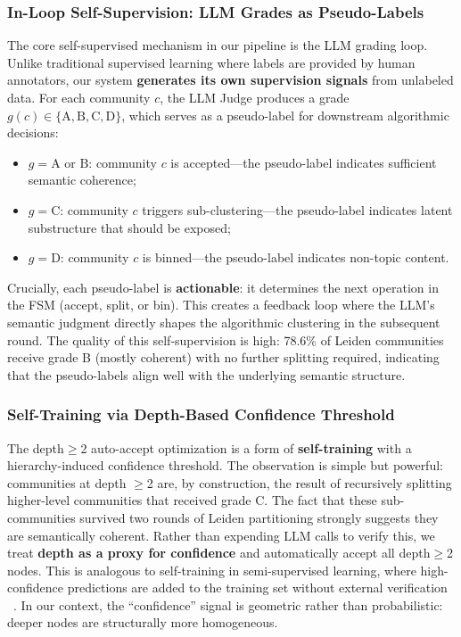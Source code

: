 \documentclass[10pt,twocolumn,twoside]{article}
\begin{document}
\subsubsection{In-Loop Self-Supervision: LLM Grades as Pseudo-Labels}

The core self-supervised mechanism in our pipeline is the LLM grading loop. Unlike 
traditional supervised learning where labels are provided by human annotators, our 
system \textbf{generates its own supervision signals} from unlabeled data. For each 
community $c$, the LLM Judge produces a grade $g(c) \in \{\text{A}, \text{B}, \text{C}, 
\text{D}\}$, which serves as a pseudo-label for downstream algorithmic decisions:

\begin{itemize}[nosep]
    \item $g = \text{A or B}$: community $c$ is accepted---the pseudo-label indicates 
    sufficient semantic coherence;
    \item $g = \text{C}$: community $c$ triggers sub-clustering---the pseudo-label 
    indicates latent substructure that should be exposed;
    \item $g = \text{D}$: community $c$ is binned---the pseudo-label indicates 
    non-topic content.
\end{itemize}

Crucially, each pseudo-label is \textbf{actionable}: it determines the next operation in 
the FSM (accept, split, or bin). This creates a feedback loop where the LLM's semantic 
judgment directly shapes the algorithmic clustering in the subsequent round. The quality 
of this self-supervision is high: 78.6\% of Leiden communities receive grade B (mostly 
coherent) with no further splitting required, indicating that the pseudo-labels align 
well with the underlying semantic structure.

\subsubsection{Self-Training via Depth-Based Confidence Threshold}

The depth$\geq$2 auto-accept optimization is a form of \textbf{self-training} with a 
hierarchy-induced confidence threshold. The observation is simple but powerful: 
communities at depth $\geq$2 are, by construction, the result of recursively splitting 
higher-level communities that received grade C. The fact that these sub-communities 
survived two rounds of Leiden partitioning strongly suggests they are semantically 
coherent. Rather than expending LLM calls to verify this, we treat \textbf{depth as 
a proxy for confidence} and automatically accept all depth$\geq$2 nodes. This is 
analogous to self-training in semi-supervised learning, where high-confidence 
predictions are added to the training set without external verification 
~\citep{lee2013pseudo}. In our context, the ``confidence'' signal is geometric rather
than probabilistic: deeper nodes are structurally more homogeneous.
\end{document}

